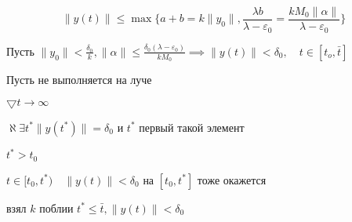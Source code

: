 \documentclass[12pt, a4paper]{article}
\begin{document}
  $$\| y(t) \| \le \max \{ a + b = k\|y_0\|, \frac{\lambda b}{\lambda- \varepsilon_0 } = \frac{k M_0\|\alpha\|}{\lambda - \varepsilon_0}\}$$

  Пусть $\| y_0 \| < \frac{\delta_0}{k}, \| \alpha\| \le \frac{\delta_0(\lambda- \varepsilon_0)}{k M_0} \implies \|y(t)\| < \delta_0, \quad t \in [t_o, \bar t ]$

  Пусть не выполняется на луче

  $\bigtriangledown t \to \infty$

  $\aleph \exists t^* \| y(t^*)\| = \delta_0$ и $t^*$ первый такой элемент
  
  $t^* > t_0$

  $t \in [t_0, t^*) \quad \| y(t) \| < \delta_0 $ на $[t_0, t^*]$ тоже окажется
  
  взял $k$ поблии $t^* \le \bar t, \| y(t) \| < \delta_0$
\end{document}
